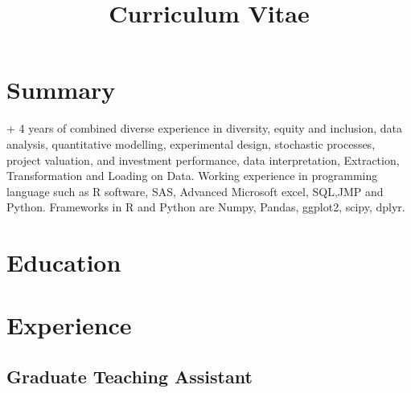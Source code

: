 \documentclass[11pt,a4paper,sans]{moderncv} %
\title{Curriculum Vitae}
\begin{document}




\makecvtitle %
\section{Summary}

+ 4 years of combined diverse experience in diversity, equity and inclusion, data analysis, quantitative modelling, experimental design, stochastic processes, project valuation, and investment performance, data interpretation, Extraction, Transformation and Loading on Data. Working experience in programming language such as R software, SAS, Advanced Microsoft excel, SQL,JMP and Python. Frameworks in R and Python are Numpy, Pandas, ggplot2, scipy, dplyr.


\section{Education}






\section{Experience}

\subsection{Graduate Teaching Assistant}
\end{document}
